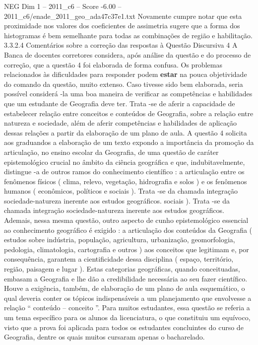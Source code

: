 \begin{textsample}{NEG Dim 1 – 2011\_c6 – Score -6.00 – 2011\_c6/enade\_2011\_geo\_ada47c37e1.txt}
Novamente cumpre notar que esta proximidade nos valores dos coeficientes de assimetria sugere que a forma dos histogramas é bem semelhante para todas as combinações de região e habilitação. 3.3.2.4 Comentários sobre a correção das respostas à Questão Discursiva 4 A Banca de docentes corretores considera, após análise da questão e do processo de correção, que a questão 4 foi elaborada de forma confusa.
Os problemas relacionados às dificuldades para responder podem \textbf{estar} na pouca objetividade do comando da questão, muito extenso.
Caso tivesse sido bem elaborada, seria possível considerá -la uma boa maneira de verificar as competências e habilidades que um estudante de Geografia deve ter.
Trata -se de aferir a capacidade de estabelecer relação entre conceitos e conteúdos de Geografia, sobre a relação entre natureza e sociedade, além de aferir competências e habilidades de aplicação dessas relações a partir da elaboração de um plano de aula.
A questão 4 solicita aos graduandos a elaboração de um texto expondo a importância da promoção da articulação, no ensino escolar da Geografia, de uma questão de caráter epistemológico crucial no âmbito da ciência geográfica e que, indubitavelmente, distingue -a de outros ramos do conhecimento científico : a articulação entre os fenômenos físicos ( clima, relevo, vegetação, hidrografia e solos ) e os fenômenos humanos ( econômicos, políticos e sociais ).
Trata -se da chamada integração sociedade-natureza inerente aos estudos geográficos. sociais ).
Trata -se da chamada integração sociedade-natureza inerente aos estudos geográficos.
Ademais, nessa mesma questão, outro aspecto de cunho epistemológico essencial ao conhecimento geográfico é exigido : a articulação dos conteúdos da Geografia ( estudos sobre indústria, população, agricultura, urbanização, geomorfologia, pedologia, climatologia, cartografia e outros ) aos conceitos que legitimam e, por consequência, garantem a cientificidade dessa disciplina ( espaço, território, região, paisagem e lugar ).
Estas categorias geográficas, quando conceituadas, embasam a Geografia e lhe dão a credibilidade necessária ao seu fazer científico.
Houve a exigência, também, de elaboração de um plano de aula esquemático, o qual deveria conter os tópicos indispensáveis a um planejamento que envolvesse a relação “ conteúdo – conceito ”.
Para muitos estudantes, essa questão se referia a um tema específico para os alunos da licenciatura, o que constituiu um equívoco, visto que a prova foi aplicada para todos os estudantes concluintes do curso de Geografia, dentre os quais muitos cursaram apenas o bacharelado.

\end{textsample}
